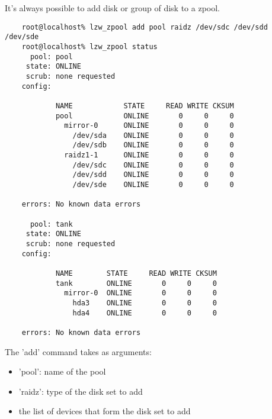 \documentclass[english]{article}
\begin{document}
It's always possible to add disk or group of disk to a zpool.
\begin{verbatim}
    root@localhost% lzw_zpool add pool raidz /dev/sdc /dev/sdd /dev/sde
    root@localhost% lzw_zpool status
      pool: pool
     state: ONLINE
     scrub: none requested
    config:
    
            NAME            STATE     READ WRITE CKSUM
            pool            ONLINE       0     0     0
              mirror-0      ONLINE       0     0     0
                /dev/sda    ONLINE       0     0     0
                /dev/sdb    ONLINE       0     0     0
              raidz1-1      ONLINE       0     0     0
                /dev/sdc    ONLINE       0     0     0
                /dev/sdd    ONLINE       0     0     0
                /dev/sde    ONLINE       0     0     0
    
    errors: No known data errors
    
      pool: tank
     state: ONLINE
     scrub: none requested
    config:
    
            NAME        STATE     READ WRITE CKSUM
            tank        ONLINE       0     0     0
              mirror-0  ONLINE       0     0     0
                hda3    ONLINE       0     0     0
                hda4    ONLINE       0     0     0
    
    errors: No known data errors
\end{verbatim}

The 'add' command takes as arguments:
\begin{itemize}
    \item 'pool': name of the pool
    \item 'raidz': type of the disk set to add
    \item the list of devices that form the disk set to add
\end{itemize}
\end{document}
